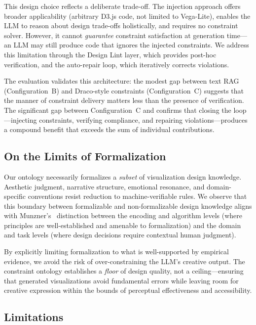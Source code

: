 This design choice reflects a deliberate trade-off. The injection approach offers broader applicability (arbitrary D3.js code, not limited to Vega-Lite), enables the LLM to reason about design trade-offs holistically, and requires no constraint solver. However, it cannot \textit{guarantee} constraint satisfaction at generation time---an LLM may still produce code that ignores the injected constraints. We address this limitation through the Design Lint layer, which provides post-hoc verification, and the auto-repair loop, which iteratively corrects violations.

The evaluation validates this architecture: the modest gap between text RAG (Configuration~B) and Draco-style constraints (Configuration~C) suggests that the manner of constraint delivery matters less than the presence of verification. The significant gap between Configuration~C and \sysname{} confirms that closing the loop---injecting constraints, verifying compliance, and repairing violations---produces a compound benefit that exceeds the sum of individual contributions.

\subsection{On the Limits of Formalization}

Our ontology necessarily formalizes a \textit{subset} of visualization design knowledge. Aesthetic judgment, narrative structure, emotional resonance, and domain-specific conventions resist reduction to machine-verifiable rules. We observe that this boundary between formalizable and non-formalizable design knowledge aligns with Munzner's~\cite{munzner2014visualization} distinction between the encoding and algorithm levels (where principles are well-established and amenable to formalization) and the domain and task levels (where design decisions require contextual human judgment).

By explicitly limiting formalization to what is well-supported by empirical evidence, we avoid the risk of over-constraining the LLM's creative output. The constraint ontology establishes a \textit{floor} of design quality, not a ceiling---ensuring that generated visualizations avoid fundamental errors while leaving room for creative expression within the bounds of perceptual effectiveness and accessibility.

\subsection{Limitations}

